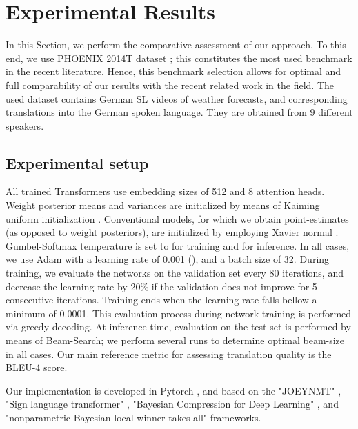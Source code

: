 \documentclass[10pt,twocolumn,letterpaper]{article}
\begin{document}
\section{Experimental Results}
\label{sec:experimental}

In this Section, we perform the comparative assessment of our approach. To this end, we use PHOENIX 2014T dataset \cite{Camgoz18}; this constitutes the most used benchmark in the recent literature. Hence, this benchmark selection allows for optimal and full comparability of our results with the recent related work in the field. The used dataset contains German SL videos of weather forecasts, and corresponding  translations into the German spoken language. They are obtained from 9 different speakers.


\subsection{Experimental setup}


All trained Transformers use embedding sizes of 512 and 8 attention heads. Weight posterior means and variances are initialized by means of Kaiming uniform initialization \cite{he2015delving}. Conventional models, for which we obtain point-estimates (as opposed to weight posteriors), are initialized by employing Xavier normal \cite{glorot2010understanding}. Gumbel-Softmax temperature is set to  for training and  for inference. In all cases, we use Adam \cite{kingma2014adam} with a learning rate of 0.001 (), and a batch size of 32. During training, we evaluate the networks on the validation set every 80 iterations, and decrease the learning rate by 20\%  if the validation does not improve for 5 consecutive iterations. Training ends when the learning rate falls bellow a minimum of 0.0001. This evaluation process during network training is performed via greedy decoding. At inference time, evaluation on the test set is performed by means of Beam-Search; we perform several runs to determine optimal beam-size in all cases. Our main reference metric for assessing translation quality is the BLEU-4 score. 

Our implementation is developed in Pytorch \cite{NEURIPS2019_9015}, and  based on the "JOEYNMT" \cite{kreutzer-etal-2019-joey},   "Sign language transformer" \cite{Camgoz20}, "Bayesian Compression for Deep Learning" \cite{elan2020}, and "nonparametric Bayesian local-winner-takes-all" \cite{panousis2019nonparametric} frameworks.
\end{document}
